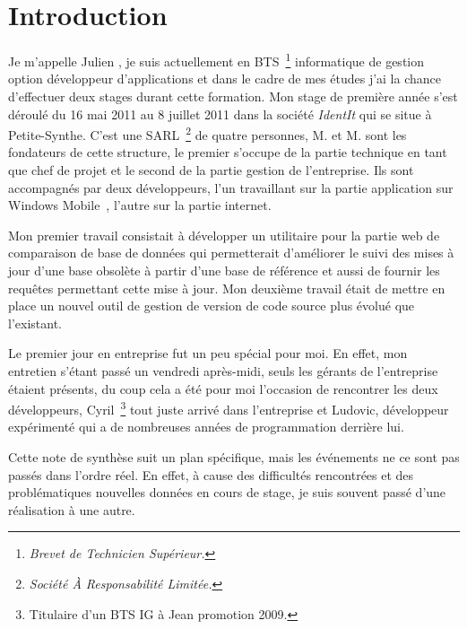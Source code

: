 \chapter{Introduction} %
\label{cha:Introduction}

Je m'appelle Julien , je suis actuellement en BTS\,
\footnote{\emph{Brevet de Technicien Supérieur.}} informatique de gestion
option développeur d'applications et dans le cadre de mes études j'ai la chance
d'effectuer deux stages durant cette formation. Mon stage de première année
s'est déroulé du 16 mai 2011 au 8 juillet 2011 dans la société \emph{IdentIt}
qui se situe à Petite-Synthe. C'est une SARL\, \footnote{\emph{Société À
Responsabilité Limitée.}} de quatre personnes, M. et
M. sont les fondateurs de cette structure, le premier s'occupe de
la partie technique en tant que chef de projet et le second de la partie
gestion de l'entreprise. Ils sont accompagnés par deux développeurs, l'un
travaillant sur la partie application sur Windows Mobile~\textregistered, l'autre
sur la partie internet.

Mon premier travail consistait à développer un utilitaire pour la partie web de
comparaison de base de données qui permetterait d'améliorer le suivi des mises
à jour d'une base obsolète à partir d'une base de référence et aussi de fournir
les requêtes permettant cette mise à jour. Mon deuxième travail était de mettre
en place un nouvel outil de gestion de version de code source plus évolué que
l'existant.

Le premier jour en entreprise fut un peu spécial pour moi. En effet, mon
entretien s'étant passé un vendredi après-midi, seuls les gérants de
l'entreprise étaient présents, du coup cela a été pour moi l'occasion de
rencontrer les deux développeurs, Cyril\, \footnote{Titulaire d'un BTS IG à
Jean  promotion 2009.} tout juste arrivé dans l'entreprise et
Ludovic, développeur expérimenté qui a de nombreuses années de programmation
derrière lui.

Cette note de synthèse suit un plan spécifique, mais les événements ne ce sont
pas passés dans l'ordre réel. En effet, à cause des difficultés rencontrées et
des problématiques nouvelles données en cours de stage, je suis souvent passé
d'une réalisation à une autre.
